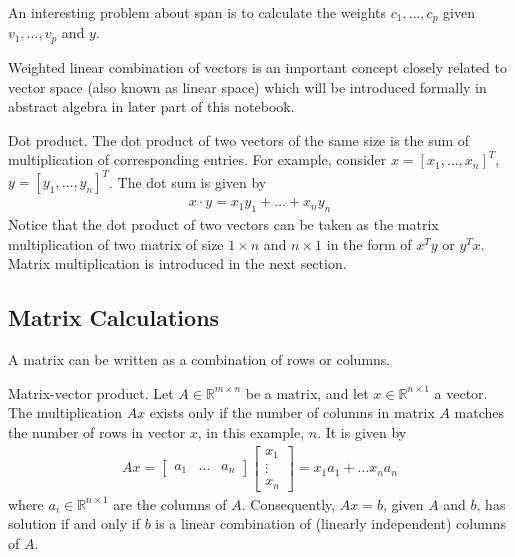 An interesting problem about span is to calculate the weights $c_1, \ldots, c_p$ given $v_1, \ldots, v_p$ and $y$.

Weighted linear combination of vectors is an important concept closely related to vector space (also known as linear space) which will be introduced formally in abstract algebra in later part of this notebook.

Dot product. The dot product of two vectors of the same size is the sum of multiplication of corresponding entries. For example, consider $x = [x_1, \ldots, x_n]^T$, $y = [y_1, \ldots, y_n]^T$. The dot sum is given by
\begin{eqnarray}
  x \cdot y = x_1y_1 + \ldots + x_ny_n \nonumber 
\end{eqnarray}
Notice that the dot product of two vectors can be taken as the matrix multiplication of two matrix of size $1\times n$ and $n\times 1$ in the form of $x^Ty$ or $y^Tx$. Matrix multiplication is introduced in the next section.

\subsection{Matrix Calculations}

A matrix can be written as a combination of rows or columns.

Matrix-vector product. Let $A \in \mathbb{R}^{m\times n}$ be a matrix, and let $x\in\mathbb{R}^{n\times 1}$ a vector. The multiplication $Ax$ exists only if the number of columns in matrix $A$ matches the number of rows in vector $x$, in this example, $n$. It is given by
\begin{eqnarray}
  Ax = \left[\begin{array}{ccc}
               a_1 & \ldots & a_n 
             \end{array}\right] \left[\begin{array}{c}
                                        x_1 \\
                                        \vdots \\
                                        x_n
                                      \end{array}\right] = x_1a_1 + \ldots x_na_n \nonumber
\end{eqnarray}
where $a_i \in\mathbb{R}^{n\times 1}$ are the columns of $A$. Consequently, $Ax=b$, given $A$ and $b$, has solution if and only if $b$ is a linear combination of (linearly independent) columns of $A$.

